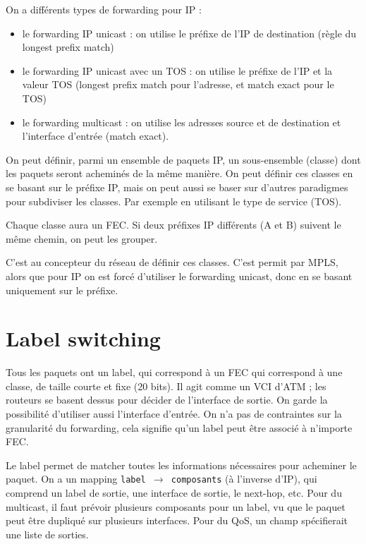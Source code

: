 		On a différents types de forwarding pour IP :
		
		\begin{itemize}
			\item le forwarding IP unicast : on utilise le préfixe de l'IP de destination (règle du longest prefix match)
			\item le forwarding IP unicast avec un TOS : on utilise le préfixe de l'IP et la valeur TOS (longest prefix match pour l'adresse, et match exact pour le TOS)
			\item le forwarding multicast : on utilise les adresses source et de destination et l'interface d'entrée (match exact). 
		\end{itemize}
		
		On peut définir, parmi un ensemble de paquets IP, un sous-ensemble (classe) dont les paquets seront acheminés de la même manière. On peut définir ces classes en se basant sur le préfixe IP, mais on peut aussi se baser sur d'autres paradigmes pour subdiviser les classes. Par exemple en utilisant le type de service (TOS).
		
		
		Chaque classe aura un FEC. Si deux préfixes IP différents (A et B) suivent le même chemin, on peut les grouper.
		
		C'est au concepteur du réseau de définir ces classes. C'est permit par MPLS, alors que pour IP on est forcé d'utiliser le forwarding unicast, donc en se basant uniquement sur le préfixe.
		
		\section{Label switching}
		
		Tous les paquets ont un label, qui correspond à un FEC qui correspond à une classe, de taille courte et fixe (20 bits). Il agit comme un VCI d'ATM ; les routeurs se basent dessus pour décider de l'interface de sortie. On garde la possibilité d'utiliser aussi l'interface d'entrée. On n'a pas de contraintes sur la granularité du forwarding, cela signifie qu'un label peut être associé à n'importe FEC.
		
		Le label permet de matcher toutes les informations nécessaires pour acheminer le paquet. On a un mapping \texttt{label $\rightarrow$ composants} (à l'inverse d'IP), qui comprend un label de sortie, une interface de sortie, le next-hop, etc. Pour du multicast, il faut prévoir plusieurs composants pour un label, vu que le paquet peut être dupliqué sur plusieurs interfaces. Pour du QoS, un champ spécifierait une liste de sorties.
		
